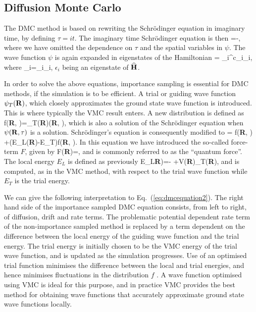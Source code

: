 \subsection*{Diffusion Monte Carlo}
The DMC method is based on rewriting the 
Schr\"odinger equation in imaginary time, by defining
$\tau=it$. The imaginary time Schr\"odinger equation is then
\be
   \frac{\partial \psi}{\partial \tau}=-\psi,
\ee
where we have omitted the dependence on $\tau$ and the spatial variables
in $\psi$.
The wave function $\psi$  is again expanded in eigenstates of the Hamiltonian 
\be
    \psi = \sum_i^{\infty}c_i\phi_i,
    \label{eq:wexpansion_dmc}
\ee 
where 
\be 
   \phi_i=\epsilon_i\phi_i, 
\ee 
$\epsilon_i$ being an eigenstate of ${\bf\widehat{H}}$. 

In order to solve the above equations, 
importance sampling is essential for DMC methods, 
if the simulation is to be efficient. 
A trial or guiding wave function $\psi_T({\bf R})$, which closely
approximates the ground state wave function is introduced.
This is where typically the VMC result enters.
A new distribution is defined as 
\be
   f({\bf R}, \tau)=\psi_T({\bf R})\psi({\bf R}, \tau),
\ee
which is also a solution of the Schr\"odinger equation when  
$\psi({\bf R}, \tau)$ 
is a solution. 
Schr\"odinger's equation is consequently modified to
\be
   =
    \nabla{}f({\bf R}, \tau)
    +(E_L({\bf R})-E_T)f({\bf R}, \tau).
    \label{eq:dmcequation2}
\ee
In this equation we have introduced the so-called force-term $F$,
given by
\be
   F({\bf R})=,
\ee
and is commonly referred to as the ``quantum force''. 
The local energy $E_L$ is defined as previously
\be
    E_L{\bf R})=-
                +V({\bf R})\psi_T({\bf R}),
\ee
and is computed, as in the VMC method, with respect to the trial wave function
while $E_T$ is the trial energy.

We can give the following interpretation to Eq.~(\ref{eq:dmcequation2}).
The right hand side of the importance sampled DMC equation
consists, from left to right, of diffusion, drift and rate terms. The
problematic potential dependent rate term of the non-importance 
sampled method is replaced by a term dependent on the difference 
between the local
energy of the guiding wave function and the trial energy. 
The trial energy is initially chosen to be the VMC energy of 
the trial  wave function, and is
updated as the simulation progresses. Use of an optimised 
trial function minimises the difference between the local 
and trial energies, and hence
minimises fluctuations in the distribution $f$ . 
A wave function optimised using VMC is ideal for this purpose, 
and in practice VMC provides the best
method for obtaining wave functions that accurately 
approximate ground state wave functions locally. 

